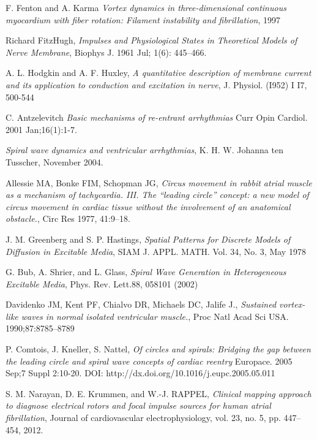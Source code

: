 \documentclass[twocolumn]{article}
\begin{document}
\begin{thebibliography}{7}
F. Fenton and A. Karma
\emph{Vortex dynamics in three-dimensional continuous myocardium with fiber
rotation: Filament instability and fibrillation},
1997

Richard FitzHugh, 
\emph{Impulses and Physiological States in Theoretical Models of Nerve Membrane},
Biophys J. 1961 Jul; 1(6): 445–466.


A. L. Hodgkin and A. F. Huxley, 
\emph{A quantitative description of membrane current and its application to conduction and excitation in nerve},
J. Physiol. (I952) I I7, 500-544

 C. Antzelevitch
\emph{Basic mechanisms of re-entrant arrhythmias}
Curr Opin Cardiol. 2001 Jan;16(1):1-7.


\emph{Spiral wave dynamics and ventricular arrhythmias},
 K. H. W. Johanna ten Tusscher,
 November 2004.

Allessie MA, Bonke FIM, Schopman JG,
\emph{ Circus movement in rabbit atrial muscle as a mechanism of tachycardia. III. The “leading circle” concept: a new model of circus movement in cardiac tissue without the involvement of an anatomical obstacle.},
 Circ Res 1977, 41:9–18.

J. M. Greenberg and S. P. Hastings, 
\emph{Spatial Patterns for Discrete Models of Diffusion in Excitable Media}, 
SIAM J. APPL. MATH.
Vol. 34, No. 3, May 1978

G. Bub, A. Shrier, and L. Glass,
\emph{Spiral Wave Generation in Heterogeneous Excitable Media},
 Phys. Rev. Lett.88, 058101 (2002)

Davidenko JM, Kent PF, Chialvo DR, Michaels DC, Jalife J., 
\emph{Sustained vortex-like waves in normal isolated ventricular muscle.},
 Proc Natl Acad Sci USA. 1990;87:8785–8789

P. Comtois, J. Kneller, S. Nattel,
\emph{Of circles and spirals: Bridging the gap between the leading circle and spiral wave concepts of cardiac reentry}
Europace. 2005 Sep;7 Suppl 2:10-20.
DOI: http://dx.doi.org/10.1016/j.eupc.2005.05.011

S. M. Narayan, D. E. Krummen, and W.-J. RAPPEL, 
\emph{Clinical mapping approach to diagnose
electrical rotors and focal impulse sources for human atrial fibrillation},
 Journal of
cardiovascular electrophysiology, vol. 23, no. 5, pp. 447–454, 2012.




\end{thebibliography}
\end{document}
